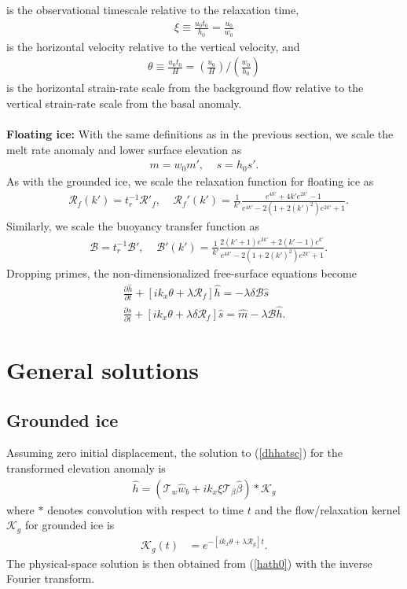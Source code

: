 \documentclass[paper=a4, fontsize=11pt]{article}
\begin{document}
is the observational timescale relative to the relaxation time,
\begin{align}
\xi \equiv \frac{u_0 t_0}{h_0} = \frac{u_0}{w_0}
\end{align}
is the horizontal velocity relative to the vertical velocity, and
\begin{align}
\theta \equiv \frac{u_0 t_0}{H} = \left(\frac{u_0}{H}\right) / \left(\frac{w_0}{h_0}\right)
\end{align}
is the horizontal strain-rate scale from the background flow relative to the vertical strain-rate
scale from the basal anomaly.
\\ \\
\textbf{Floating ice:}
With the same definitions as in the previous section, we scale the melt rate anomaly
and lower surface elevation as
\begin{align}
m = w_0 m',\;\;\;\; s = h_0 s'.
\end{align}
As with the grounded ice, we scale the relaxation function for floating ice as
\begin{align}
   &\mathcal{R}_f(k') = t_r^{-1} \mathcal{R}'_f, \;\;\;\;
 \mathcal{R}_f'(k') =  \frac{1}{k'}\frac{e^{4k'} +4k' e^{2k'} -1 }{e^{4k'} -2(1+2(k')^2)e^{2k'} +1}. \label{Rfsc}
\end{align}
Similarly, we scale the buoyancy transfer function as
\begin{align}
   &\mathcal{B} =  t_r^{-1} \mathcal{B}', \;\;\;\;
 \mathcal{B}'(k') =   \frac{1}{k'}\frac{ 2(k'+1)e^{3k'}+2(k'-1)e^{k'} }{e^{4k'} -2(1+2(k')^2)e^{2k'} +1}. \label{Bsc}
\end{align}
Dropping primes, the non-dimensionalized free-surface equations become
\begin{align}
\frac{\partial \widehat{h}}{\partial t}+ \left[ik_x \theta  + \lambda \mathcal{R}_f\right]\widehat{h} = -\lambda \delta\mathcal{B}\widehat{s}\label{hfsc}\\
\frac{\partial \widehat{s}}{\partial t}+ [ik_x\theta  + \lambda\delta \mathcal{R}_f]\widehat{s} = \widehat{m} - \lambda \mathcal{B} \widehat{h}.\label{sfsc}
\end{align}

\section*{General solutions}
\subsection*{Grounded ice}
Assuming zero initial displacement, the solution to (\ref{dhhatsc}) for the transformed elevation anomaly is
\begin{align}
\widehat{h} = (\mathcal{T}_w\widehat{w}_b + ik_x\xi\mathcal{T}_{\beta}\widehat{\beta}  )* \mathcal{K}_g \label{hath0}
\end{align}
where $*$ denotes convolution with respect to time $t$ and
the flow/relaxation kernel $\mathcal{K}_g$ for grounded ice is
\begin{align}
\mathcal{K}_g(t) &= e^{-[ik_x\theta+\lambda \mathcal{R}_g]t}.
\end{align}
The physical-space solution is then obtained from (\ref{hath0}) with the inverse Fourier transform.
\end{document}
